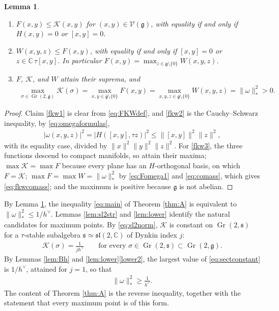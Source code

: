 \documentclass[leqno,10pt]{amsart}
\newtheorem{lemma}[theorem]{Lemma}%
\theoremstyle{definition}
\numberwithin{equation}{section}
\newcommand{\grass}{\operatorname{Gr}}
\newcommand{\sect}{\mathscr{K}}
\newcommand{\om}{\omega}
\newcommand{\sll}{\mathfrak{sl}}
\newcommand{\g}{\mathfrak{g}}
\newcommand{\stiefel}{\mathscr{V}}
\newcommand{\com}{\mathbb C}
\newcommand{\hv}{h^\vee}
\newcommand{\norm}[1]{\lVert #1\rVert}
\newcommand{\comass}[1]{\lVert #1\rVert_{\ast}}%
\newcommand{\subs}{\mathfrak{s}}
\begin{document}
\begin{lemma}\label{fkwmaxlemma}
\leavevmode\noindent
\begin{enumerate}[label=(\arabic*), ref=(\arabic*)]
\item\label{fkw1} $F(x, y) \leq \sect(x, y)$ for $(x, y) \in \stiefel(\g)$, with equality if and only if $H(x, y) = 0$ or $[x, y] = 0$.
\item\label{fkw2} $W(x, y, z) \leq F(x, y)$, with equality if and only if $[x, y] = 0$ or $z \in \com\,\tau[x, y]$. In particular $F(x,y)=\max_{z \in \g \setminus \{0\}}W(x,y,z)$.
\item\label{fkw3} $F$, $\sect$, and $W$ attain their suprema, and
\begin{align}\label{eq:fkwcomass}
\max_{\sigma \in \grass(2, \g)} \sect(\sigma) = \max_{x, y \in \g \setminus \{0\}} F(x, y) = \max_{x, y, z \in \g \setminus \{0\}} W(x, y, z) =\comass{\om}^2 > 0.
\end{align}
\end{enumerate}
\end{lemma}

\begin{proof}
Claim \ref{fkw1} is clear from \eqref{eq:FKWdef}, and \ref{fkw2} is the Cauchy--Schwarz inequality, by \eqref{eq:omegaformulas},
\begin{align}\label{eq:Fomega1}
|\omega(x,y,z)|^{2} = |H([x, y], \tau z)|^{2} \leq \norm{[x, y]}^{2}\norm{z}^{2},
\end{align}
with its equality case, divided by $\norm{x}^{2}\norm{y}^{2}\norm{z}^{2}$. For \ref{fkw3}, the three functions descend to compact manifolds, so attain their maxima; $\max\sect = \max F$ because every plane has an $H$-orthogonal basis, on which $F = \sect$; $\max F = \max W = \comass{\om}^{2}$ by \eqref{eq:Fomega1} and \eqref{eq:comass}, which gives \eqref{eq:fkwcomass}; and the maximum is positive because $\g$ is not abelian.
\end{proof}

By Lemma \ref{fkwmaxlemma}, the inequality \eqref{eq:main} of Theorem \ref{thm:A} is equivalent to $\comass{\om}^{2} \leq 1/\hv$. Lemmas \ref{lem:sl2str} and \ref{lem:lower} identify the natural candidates for maximum points. By \eqref{eq:sl2norm}, $\sect$ is constant on $\grass(2, \subs)$ for a $\tau$-stable subalgebra $\subs \simeq \sll(2, \com)$ of Dynkin index $j$:
\begin{align}\label{eq:sectconstant}
\sect(\sigma) = \frac{1}{j\hv} \qquad \text{for every } \sigma \in \grass(2, \subs) \subset \grass(2, \g).
\end{align}
By Lemmas \ref{lem:Bh} and \ref{lem:lower}\ref{lower2}, the largest value of \eqref{eq:sectconstant} is $1/\hv$, attained for $j = 1$, so that
\begin{align}\label{eq:lowerbound}
\comass{\om}^{2} \geq \frac{1}{\hv}.
\end{align}
The content of Theorem \ref{thm:A} is the reverse inequality, together with the statement that every maximum point is of this form.
\end{document}

